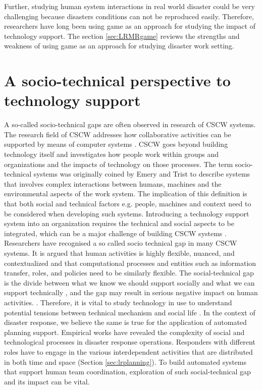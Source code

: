 Further, studying human system interactions in real world disaster could be very challenging because disasters conditions can not be reproduced easily. Therefore, researchers have long been using game as an approach for studying the impact of technology support.  The section \ref{sec:LRMRgame} reviews the strengths and weakness of using game as an approach for studying disaster work setting. \\


\section{A socio-technical perspective to technology support} \label{sec:LRSocialTechnical}

A so-called socio-technical gaps are often observed in research of \acf{CSCW} systems. The research field of \ac{CSCW} addresses how collaborative activities can be supported by means of computer systems \cite{Carstensen1999}.  \ac{CSCW} goes beyond building technology itself and investigates how people work within groups and organizations and the impacts of technology on those processes. The term socio-technical systems was originally coined by Emery and Trist \cite{Ropohl1999} to describe systems that involves complex interactions between humans, machines and the environmental aspects of the work system. The implication of this definition is that both social and technical factors e.g. people, machines and context need to be considered when developing such systems. Introducing a technology support system into an organization requires the technical and social aspects to be integrated, which can be a major challenge of building \ac{CSCW} systems \cite{Ackerman2000}. \\

Researchers have recognised a so called socio technical gap in many \ac{CSCW} systems. It is argued that \cite{Ackerman2000}  human activities is highly flexible, nuanced, and contextualized and that computational processes and entities such as information transfer, roles, and policies need to be similarly flexible. The social-technical gap is the divide between what we know we should support socially and what we can support technically \cite{Ackerman2000}, and the gap may result in serious negative impact on human activities. \cite{Bowers1994,Abbott1994a}. Therefore, it is vital to study technology in use to understand potential tensions between technical mechanism and social life \cite{Bowers1994}.  In the context of disaster response, we believe the same is true for the application of automated planning support. Empirical works \cite{Kopena2008,Fischer2015,Zerger2003} have revealed the complexity of social and technological processes in disaster response operations. Responders with different roles have to engage in the various interdependent activities that are distributed in both time and space (Section \ref{sec:lrplanning}). To build automated systems that support human team coordination, exploration of such social-technical gap and its impact can be vital. \\ 

